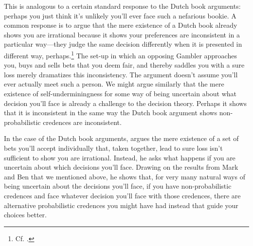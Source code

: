 \documentclass[a4paper,final]{article}
\newenvironment{CCM rewritten}
{\begingroup\color{blue}} %
{\endgroup}              %
\begin{document}
This is analogous to a certain standard response to the Dutch book arguments: perhaps you just think it's unlikely you'll ever face such a nefarious bookie. A common response is to argue that the mere existence of a Dutch book already shows you are irrational because it shows your preferences are inconsistent in a particular way---they judge the same decision differently when it is presented in different way, perhaps.\footnote{Cf. \citep{armendt1993db,mahtani2014db}.} %
{The set-up in which an opposing Gambler approaches you, buys and sells bets that you deem fair, and thereby saddles you with a sure loss merely dramatizes this inconsistency.} The argument doesn't assume you'll ever actually meet such a person. We might argue similarly that the mere existence of self-underminingness for some way of being uncertain about what decision you'll face is already a challenge to the decision theory. Perhaps it shows that it is inconsistent in the same way the Dutch book argument shows non-probabilistic credences are inconsistent.

In the case of the Dutch book arguments,  argues the mere existence of a set of bets you'll accept individually that, taken together, lead to sure loss isn't sufficient to show you are  irrational. Instead, he asks what happens if you are uncertain about which decisions you'll face. Drawing on the results from Mark \citet{schervish1989gm} and Ben \citet{levinstein2017pgeu} that we mentioned above, he shows that, for very  many natural ways of being uncertain about the decisions you'll face, if you have non-probabilistic credences and face whatever decision you'll face with those credences, there are alternative probabilistic credences you might have had instead that guide your choices better.
\end{document}
